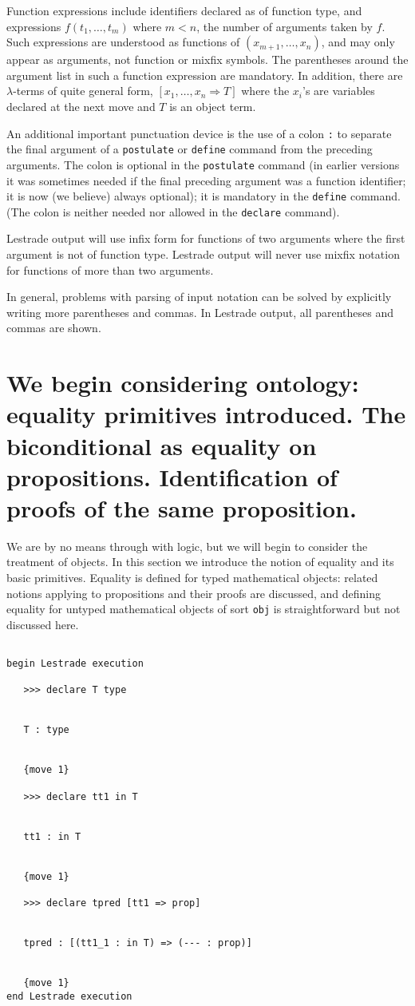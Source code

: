 \documentclass[12pt]{article}
\begin{document}
Function expressions include identifiers declared as of function type, and expressions $f(t_1,\ldots,t_m)$ where $m<n$, the number of arguments taken by $f$.  Such expressions are understood as functions of $(x_{m+1},\ldots,x_n)$, and may only appear as arguments, not function or mixfix symbols.  The parentheses around the argument list in such a function expression are mandatory.  In addition, there are $\lambda$-terms of quite general form, $[x_1,\ldots,x_n \Rightarrow T]$ where the $x_i$'s are variables declared at the next move and $T$ is an object term.

An additional important punctuation device is the use of a colon {\tt :} to separate the final argument of a {\tt postulate} or {\tt define} command from the preceding arguments.  The colon is optional in the {\tt postulate} command (in earlier versions it was sometimes needed if the final preceding argument was a function identifier; it is now (we believe) always optional); it is mandatory in the {\tt define} command.  (The colon is neither needed nor allowed in the {\tt declare} command).

Lestrade output will use infix form for functions of two arguments where the first argument is not of function type.  Lestrade output will never use mixfix notation for functions of more than two arguments.

In general, problems with parsing of input notation can be solved by explicitly writing more parentheses and commas.  In Lestrade  output, all parentheses and commas are shown.

\section{We begin considering ontology:  equality primitives introduced.  The biconditional as equality on propositions.  Identification of proofs of the same proposition.}

We are by no means through with logic, but we will begin to consider the treatment of objects.  In this section we introduce the notion of equality and its basic primitives.  Equality is defined for typed mathematical objects:  related notions applying to propositions and their proofs are discussed, and defining equality for untyped mathematical objects of sort {\tt obj} is straightforward but not discussed here.

\begin{verbatim}

begin Lestrade execution

   >>> declare T type


   T : type


   {move 1}

   >>> declare tt1 in T


   tt1 : in T


   {move 1}

   >>> declare tpred [tt1 => prop]


   tpred : [(tt1_1 : in T) => (--- : prop)]


   {move 1}
end Lestrade execution
\end{verbatim}
\end{document}
